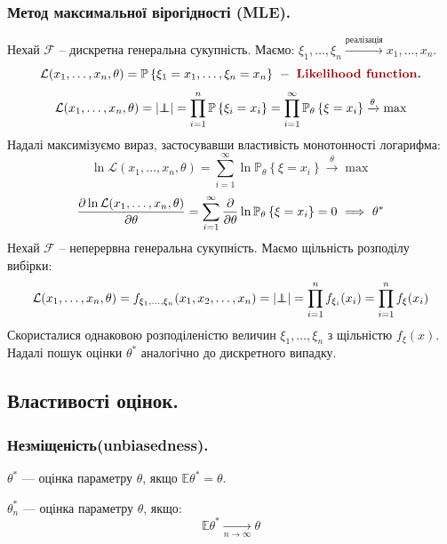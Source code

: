 \subsubsection{Метод максимальної вірогідності (MLE).}
\vspace*{-1em}
Нехай $\mathcal{F}$ -- дискретна генеральна сукупність. Маємо:
$
\xi_1 , \dots , \xi_n \xrightarrow{\text{реалізація}} x_1 , \dots , x_n
$.
$$
\mathcal{L} (x_1, \dots, x_n, \theta) = \mathbb{P} \left\lbrace \xi_1 = x_1 , \dots , \xi_n = x_n \right\rbrace \  - \  \red{ Likelihood function.}
$$
\vspace*{-1em}
$$
\mathcal{L} (x_1, \dots, x_n, \theta)  = \left| \independent \right| =  \prod\limits_{i = 1}^{n}{ \mathbb{P} \left\lbrace \xi_i = x_i \right\rbrace} =
 \prod\limits_{i = 1}^{ \infty}{\mathbb{P}_{\theta} \left\lbrace \xi= x_i \right\rbrace} \xrightarrow{\theta} \max
$$
Надалі максимізуємо вираз, застосувавши властивість монотонності логарифма:
\vspace*{-0.5em}
$$
\ln \mathcal{L} (x_1, \dots, x_n, \theta)   =  \sum\limits_{i = 1}^{ \infty} { \ln \mathbb{P}_{\theta} \left\lbrace \xi= x_i \right\rbrace} \xrightarrow{\theta} \max
$$
\vspace*{-0.5em}
$$
\frac{ \d \ln \mathcal{L} (x_1, \dots, x_n, \theta)}{\d \theta}    =
 \sum\limits_{i = 1}^{ \infty} { \frac{\d }{\d \theta}  \ln \mathbb{P}_{\theta} \left\lbrace \xi= x_i \right\rbrace} =  0 \ \Longrightarrow \  \theta^*
$$
Нехай $\mathcal{F}$ -- неперервна генеральна сукупність. Маємо щільність розподілу вибірки:
\vspace*{-0.5em}
$$
\mathcal{L} (x_1, \dots, x_n , \theta) = f_{\xi_1 , \dots , \xi_n }(x_1, x_2 , \dots, x_n) =  \left| \independent \right| =  \prod\limits_{i = 1}^{n}{ f_{\xi_i} (x_i)} = \prod\limits_{i = 1}^{n}{ f_{\xi} (x_i)}
$$
Скористалися однаковою розподіленістю величин $\xi_1 , \dots , \xi_n$ з щільністю $f_{\xi} (x)$.\\ Надалі пошук оцінки $\theta^*$ аналогічно до дискретного випадку.
\subsection{Властивості оцінок.}
\subsubsection{Незміщеність(unbiasedness).}
\begin{defo}$\theta^*$ ---  оцінка параметру $\theta$, якщо $\mathbb{E} \theta^* = \theta$.
\end{defo}
\begin{defo}$\theta^*_n$ ---  оцінка параметру $\theta$, якщо:
$$\mathbb{E} \theta^* \xrightarrow[n\to\infty]{} \theta$$
\end{defo}
